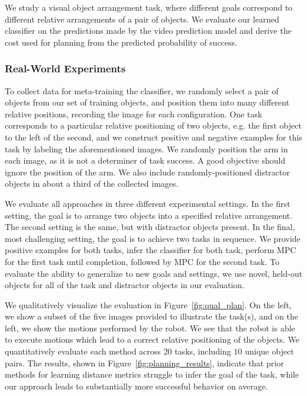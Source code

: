 We study a visual object arrangement task, where different goals correspond to different relative arrangements of a pair of objects. We evaluate our learned classifier on the predictions made by the video prediction model and derive the cost used for planning from the predicted probability of success.

\subsubsection{Real-World Experiments}

To collect data for meta-training the classifier, we randomly select a pair of objects from our set of training objects, and position them into many different relative positions, recording the image for each configuration. One task corresponds to a particular relative positioning of two objects, e.g. the first object to the left of the second, and we construct positive and negative examples for this task by labeling the aforementioned images. We randomly position the arm in each image, as it is not a determiner of task success. A good objective should ignore the position of the arm. We also include randomly-positioned distractor objects in about a third of the collected images.

We evaluate all approaches in three different experimental settings. In the first setting, the goal is to arrange two objects into a specified relative arrangement. The second setting is the same, but with distractor objects present. In the final, most challenging setting, the goal is to achieve two tasks in sequence. We provide positive examples for both tasks, infer the classifier for both task, perform MPC for the first task until completion, followed by MPC for the second task. To evaluate the ability to generalize to new goals and settings, we use novel, held-out objects for all of the task and distractor objects in our evaluation. 

We qualitatively visualize the evaluation in Figure~\ref{fig:qual_plan}. On the left, we show a subset of the five images provided to illustrate the task(s), and on the left, we show the motions performed by the robot. We see that the robot is able to execute motions which lead to a correct relative positioning of the objects.
We quantitatively evaluate each method across 20 tasks, including $10$ unique object pairs. The results, shown in Figure~\ref{fig:planning_results}, indicate that prior methods for learning distance metrics struggle to infer the goal of the task, while our approach leads to substantially more successful behavior on average. 

